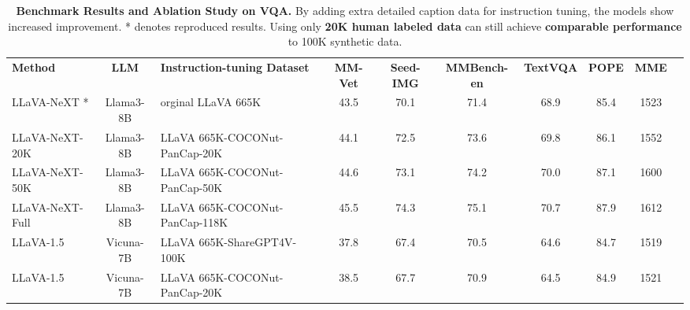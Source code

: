 

\begin{table*}[htbp]
\centering
{}
\begin{tabular}{l|c|l|ccccccc}

\textbf{Method   }              & \textbf{LLM }      & \textbf{Instruction-tuning Dataset}       & \textbf{MM-Vet} & \textbf{Seed-IMG} & \textbf{MMBench-en} & \textbf{TextVQA} & \textbf{POPE} & \textbf{MME}  \\
\shline
LLaVA-NeXT * & Llama3-8B & orginal LLaVA 665K~\cite{liu2024llavanext}               & 43.5   & 70.1     & 71.4        & 68.9    & 85.4 & 1523 \\
LLaVA-NeXT-20K                & Llama3-8B & LLaVA 665K-COCONut-PanCap-20K               & 44.1   & 72.5     & 73.6        & 69.8    & 86.1 & 1552 \\
LLaVA-NeXT-50K                & Llama3-8B & LLaVA 665K-COCONut-PanCap-50K                     & 44.6   & 73.1     & 74.2        & 70.0    & 87.1 & 1600 \\
LLaVA-NeXT-Full               & Llama3-8B & LLaVA 665K-COCONut-PanCap-118K                  & 45.5   & 74.3     & 75.1        & 70.7    & 87.9 & 1612 \\
\hline

LLaVA-1.5  & Vicuna-7B & LLaVA 665K-ShareGPT4V-100K & 37.8 & 67.4 &70.5 & 64.6 & 84.7& 1519 \\
 
LLaVA-1.5  & Vicuna-7B & LLaVA 665K-COCONut-PanCap-20K  & 38.5 & 67.7 &70.9 &64.5 & 84.9 & 1521 \\
\end{tabular}
\caption{\textbf{Benchmark Results and Ablation Study on VQA.}  By adding extra detailed caption data for instruction tuning, the models show increased improvement. * denotes reproduced results. Using only \textbf{20K human labeled data} can still achieve \textbf{comparable performance} to 100K synthetic data.
}
\label{tab:ablate_vqa}
\end{table*}


